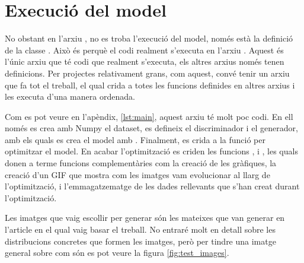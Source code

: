 \section{Execució del model}

No obstant en l'arxiu , no es troba l'execució del model, només està la definició de la classe . Això és perquè el codi realment s'executa en l'arxiu . Aquest és l'únic arxiu que té codi que realment s'executa, els altres arxius només tenen definicions. Per projectes relativament grans, com aquest, convé tenir un arxiu que fa tot el treball, el qual crida a totes les funcions definides en altres arxius i les executa d'una manera ordenada. 

Com es pot veure en l'apèndix, \ref{lst:main}, aquest arxiu té molt poc codi. En ell només es crea amb Numpy el dataset, es defineix el discriminador i el generador, amb els quals es crea el model amb . Finalment, es crida a la funció  per optimitzar el model. En acabar l'optimització es criden les funcions ,  i , les quals donen a terme funcions complementàries com la creació de les gràfiques, la creació d'un GIF que mostra com les imatges vam evolucionar al llarg de l'optimització, i l'emmagatzematge de les dades rellevants que s'han creat durant l'optimització.

Les imatges que vaig escollir per generar són les mateixes que van generar en l'article en el qual vaig basar el treball. No entraré molt en detall sobre les distribucions concretes que formen les imatges, però per tindre una imatge general sobre com són es pot veure la figura \ref{fig:test_images}.

